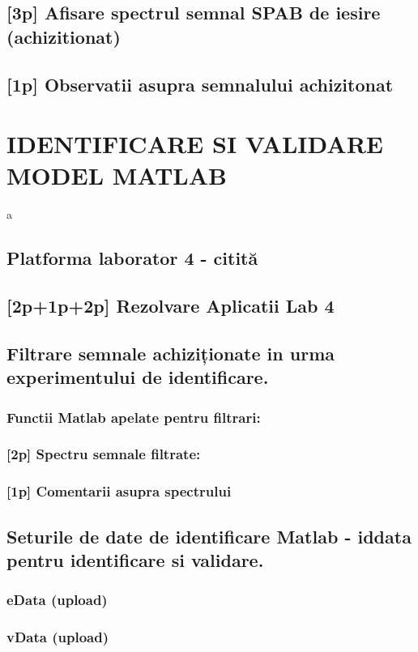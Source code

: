 \documentclass[12pt,english]{article}
\begin{document}
\subsection { [3p] Afisare spectrul semnal SPAB de iesire (achizitionat) }
\subsection { [1p] Observatii asupra semnalului achizitonat }

\section { IDENTIFICARE SI VALIDARE MODEL MATLAB }
a
\subsection { Platforma laborator 4 - citită                                  }
\subsection { [2p+1p+2p] Rezolvare Aplicatii Lab 4 }
\subsection { Filtrare semnale achiziționate in urma experimentului de identificare. }
\subsubsection { Functii Matlab apelate pentru filtrari: }
\subsubsection { [2p] Spectru semnale filtrate: }
\subsubsection { [1p] Comentarii asupra spectrului }
\subsection { Seturile de date de identificare Matlab - iddata pentru identificare si validare. }
\subsubsection { eData  (upload) }
\subsubsection { vData  (upload) }
\end{document}
